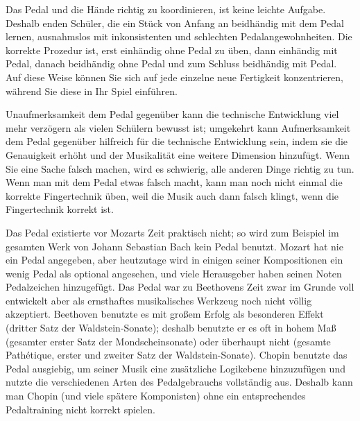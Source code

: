 Das Pedal und die Hände richtig zu koordinieren, ist keine leichte Aufgabe.
Deshalb enden Schüler, die ein Stück von Anfang an beidhändig mit dem Pedal lernen, ausnahmslos mit inkonsistenten und schlechten Pedalangewohnheiten.
Die korrekte Prozedur ist, erst einhändig ohne Pedal zu üben, dann einhändig mit Pedal, danach beidhändig ohne Pedal und zum Schluss beidhändig mit Pedal.
Auf diese Weise können Sie sich auf jede einzelne neue Fertigkeit konzentrieren, während Sie diese in Ihr Spiel einführen.

Unaufmerksamkeit dem Pedal gegenüber kann die technische Entwicklung viel mehr verzögern als vielen Schülern bewusst ist; umgekehrt kann Aufmerksamkeit dem Pedal gegenüber hilfreich für die technische Entwicklung sein, indem sie die Genauigkeit erhöht und der Musikalität eine weitere Dimension hinzufügt.
Wenn Sie eine Sache falsch machen, wird es schwierig, alle anderen Dinge richtig zu tun.
Wenn man mit dem Pedal etwas falsch macht, kann man noch nicht einmal die korrekte Fingertechnik üben, weil die Musik auch dann falsch klingt, wenn die Fingertechnik korrekt ist.

Das Pedal existierte vor Mozarts Zeit praktisch nicht;
so wird zum Beispiel im gesamten Werk von Johann Sebastian Bach kein Pedal benutzt.
Mozart hat nie ein Pedal angegeben, aber heutzutage wird in einigen seiner Kompositionen ein wenig Pedal als optional angesehen, und viele Herausgeber haben seinen Noten Pedalzeichen hinzugefügt.
Das Pedal war zu Beethovens Zeit zwar im Grunde voll entwickelt aber als ernsthaftes musikalisches Werkzeug noch nicht völlig akzeptiert.
Beethoven benutzte es mit großem Erfolg als besonderen Effekt (dritter Satz der Waldstein-Sonate);
deshalb benutzte er es oft in hohem Maß (gesamter erster Satz der Mondscheinsonate) oder überhaupt nicht (gesamte Pathétique, erster und zweiter Satz der Waldstein-Sonate). Chopin benutzte das Pedal ausgiebig, um seiner Musik eine zusätzliche Logikebene hinzuzufügen und nutzte die verschiedenen Arten des Pedalgebrauchs vollständig aus.
Deshalb kann man Chopin (und viele spätere Komponisten) ohne ein entsprechendes Pedaltraining nicht korrekt spielen.

